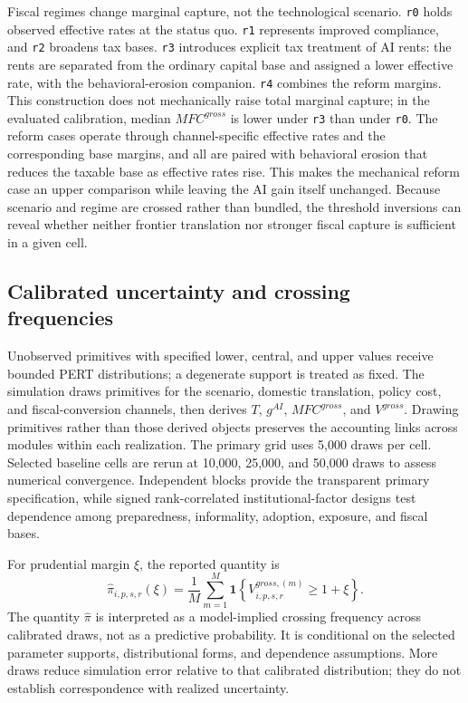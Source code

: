 Fiscal regimes change marginal capture, not the technological scenario. \texttt{r0} holds observed effective rates at the status quo. \texttt{r1} represents improved compliance, and \texttt{r2} broadens tax bases. \texttt{r3} introduces explicit tax treatment of AI rents: the rents are separated from the ordinary capital base and assigned a lower effective rate, with the behavioral-erosion companion. \texttt{r4} combines the reform margins. This construction does not mechanically raise total marginal capture; in the evaluated calibration, median $MFC^{gross}$ is lower under \texttt{r3} than under \texttt{r0}. The reform cases operate through channel-specific effective rates and the corresponding base margins, and all are paired with behavioral erosion that reduces the taxable base as effective rates rise. This makes the mechanical reform case an upper comparison while leaving the AI gain itself unchanged. Because scenario and regime are crossed rather than bundled, the threshold inversions can reveal whether neither frontier translation nor stronger fiscal capture is sufficient in a given cell.

\subsection{Calibrated uncertainty and crossing frequencies}\label{subsec:uncertainty_clean}

Unobserved primitives with specified lower, central, and upper values receive bounded PERT distributions; a degenerate support is treated as fixed. The simulation draws primitives for the scenario, domestic translation, policy cost, and fiscal-conversion channels, then derives $T$, $g^{AI}$, $MFC^{gross}$, and $V^{gross}$. Drawing primitives rather than those derived objects preserves the accounting links across modules within each realization. The primary grid uses 5,000 draws per cell. Selected baseline cells are rerun at 10,000, 25,000, and 50,000 draws to assess numerical convergence. Independent blocks provide the transparent primary specification, while signed rank-correlated institutional-factor designs test dependence among preparedness, informality, adoption, exposure, and fiscal bases.

For prudential margin $\xi$, the reported quantity is
\begin{equation}
  \widehat{\pi}_{i,p,s,r}(\xi)
  =\frac{1}{M}\sum_{m=1}^{M}
   \mathbf{1}\!\left\{V^{gross,(m)}_{i,p,s,r}\geq1+\xi\right\}.
  \label{eq:crossing_frequency_clean}
\end{equation}
The quantity $\widehat{\pi}$ is interpreted as a model-implied crossing frequency across calibrated draws, not as a predictive probability. It is conditional on the selected parameter supports, distributional forms, and dependence assumptions. More draws reduce simulation error relative to that calibrated distribution; they do not establish correspondence with realized uncertainty.

